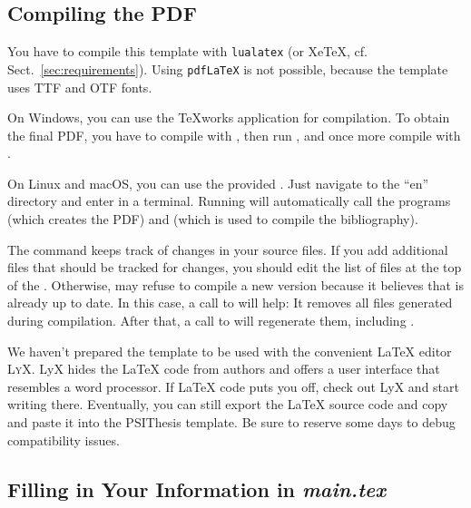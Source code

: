 \subsection{Compiling the PDF}
\label{sec:compile}

You have to compile this template with \texttt{lualatex} (or XeTeX, cf. Sect.~\ref{sec:requirements}). Using \texttt{pdfLaTeX} is not possible, because the template uses TTF and OTF fonts.

On Windows, you can use the TeXworks application for compilation. To obtain the final PDF, you have to compile  with , then run , and once more compile  with .

On Linux and macOS, you can use the provided .
Just navigate to the ``en'' directory and enter  in a terminal. Running  will automatically call the programs  (which creates the PDF) and  (which is used to compile the bibliography).

The  command keeps track of changes in your source files. If you add additional files that should be tracked for changes, you should edit the list of files at the top of the .
Otherwise,  may refuse to compile a new version because it believes that  is already up to date. In this case, a call to  will help: It removes all files generated during compilation. After that, a call to  will regenerate them, including .


We haven't prepared the template to be used with the convenient LaTeX editor \textsc{LyX}. LyX hides the LaTeX code from authors and offers a user interface that resembles a word processor.
If LaTeX code puts you off, check out LyX and start writing there. Eventually, you can still export the LaTeX source code and copy and paste it into the PSIThesis template. Be sure to reserve some days to debug compatibility issues.

\subsection{Filling in Your Information in \emph{main.tex}}\label{sec:fillingdetails}

